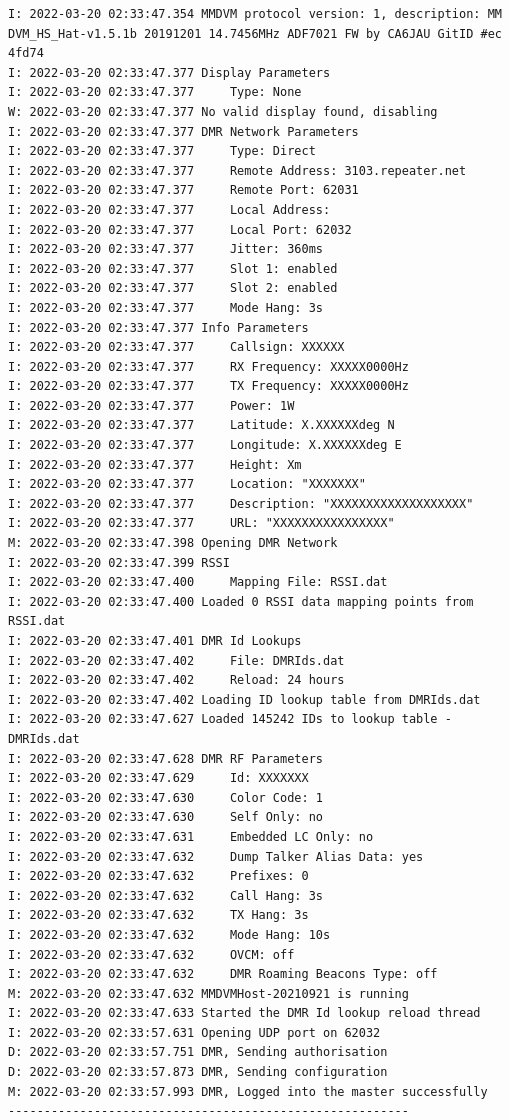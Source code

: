 \documentclass[a4j,oneside]{ujbook}
\begin{document}
\begin{verbatim}
I: 2022-03-20 02:33:47.354 MMDVM protocol version: 1, description: MM
DVM_HS_Hat-v1.5.1b 20191201 14.7456MHz ADF7021 FW by CA6JAU GitID #ec
4fd74
I: 2022-03-20 02:33:47.377 Display Parameters
I: 2022-03-20 02:33:47.377     Type: None
W: 2022-03-20 02:33:47.377 No valid display found, disabling
I: 2022-03-20 02:33:47.377 DMR Network Parameters
I: 2022-03-20 02:33:47.377     Type: Direct
I: 2022-03-20 02:33:47.377     Remote Address: 3103.repeater.net
I: 2022-03-20 02:33:47.377     Remote Port: 62031
I: 2022-03-20 02:33:47.377     Local Address: 
I: 2022-03-20 02:33:47.377     Local Port: 62032
I: 2022-03-20 02:33:47.377     Jitter: 360ms
I: 2022-03-20 02:33:47.377     Slot 1: enabled
I: 2022-03-20 02:33:47.377     Slot 2: enabled
I: 2022-03-20 02:33:47.377     Mode Hang: 3s
I: 2022-03-20 02:33:47.377 Info Parameters
I: 2022-03-20 02:33:47.377     Callsign: XXXXXX
I: 2022-03-20 02:33:47.377     RX Frequency: XXXXX0000Hz
I: 2022-03-20 02:33:47.377     TX Frequency: XXXXX0000Hz
I: 2022-03-20 02:33:47.377     Power: 1W
I: 2022-03-20 02:33:47.377     Latitude: X.XXXXXXdeg N
I: 2022-03-20 02:33:47.377     Longitude: X.XXXXXXdeg E
I: 2022-03-20 02:33:47.377     Height: Xm
I: 2022-03-20 02:33:47.377     Location: "XXXXXXX"
I: 2022-03-20 02:33:47.377     Description: "XXXXXXXXXXXXXXXXXXX"
I: 2022-03-20 02:33:47.377     URL: "XXXXXXXXXXXXXXXX"
M: 2022-03-20 02:33:47.398 Opening DMR Network
I: 2022-03-20 02:33:47.399 RSSI
I: 2022-03-20 02:33:47.400     Mapping File: RSSI.dat
I: 2022-03-20 02:33:47.400 Loaded 0 RSSI data mapping points from RSSI.dat
I: 2022-03-20 02:33:47.401 DMR Id Lookups
I: 2022-03-20 02:33:47.402     File: DMRIds.dat
I: 2022-03-20 02:33:47.402     Reload: 24 hours
I: 2022-03-20 02:33:47.402 Loading ID lookup table from DMRIds.dat
I: 2022-03-20 02:33:47.627 Loaded 145242 IDs to lookup table - DMRIds.dat
I: 2022-03-20 02:33:47.628 DMR RF Parameters
I: 2022-03-20 02:33:47.629     Id: XXXXXXX
I: 2022-03-20 02:33:47.630     Color Code: 1
I: 2022-03-20 02:33:47.630     Self Only: no
I: 2022-03-20 02:33:47.631     Embedded LC Only: no
I: 2022-03-20 02:33:47.632     Dump Talker Alias Data: yes
I: 2022-03-20 02:33:47.632     Prefixes: 0
I: 2022-03-20 02:33:47.632     Call Hang: 3s
I: 2022-03-20 02:33:47.632     TX Hang: 3s
I: 2022-03-20 02:33:47.632     Mode Hang: 10s
I: 2022-03-20 02:33:47.632     OVCM: off
I: 2022-03-20 02:33:47.632     DMR Roaming Beacons Type: off
M: 2022-03-20 02:33:47.632 MMDVMHost-20210921 is running
I: 2022-03-20 02:33:47.633 Started the DMR Id lookup reload thread
I: 2022-03-20 02:33:57.631 Opening UDP port on 62032
D: 2022-03-20 02:33:57.751 DMR, Sending authorisation
D: 2022-03-20 02:33:57.873 DMR, Sending configuration
M: 2022-03-20 02:33:57.993 DMR, Logged into the master successfully
--------------------------------------------------------
\end{verbatim}
\end{document}
